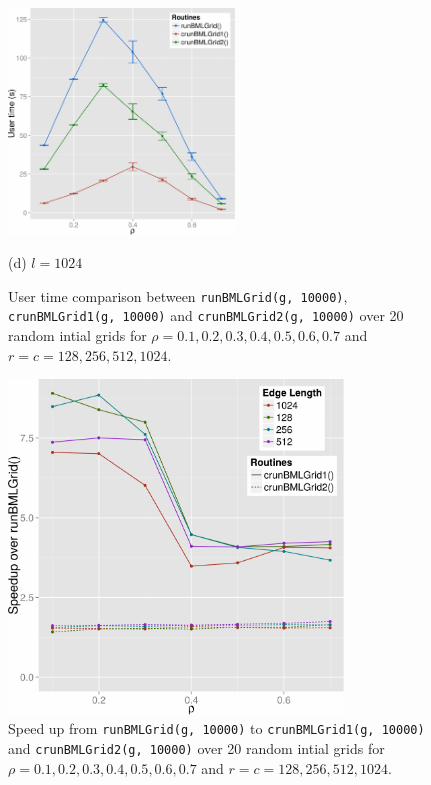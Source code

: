 \documentclass{article}
\begin{document}
\begin{figure}[H]
\begin{minipage}[b]{0.5\linewidth}
    \end{minipage}
    \hfill
    \begin{minipage}[b]{0.5\linewidth}
      \centering
      \centerline{\includegraphics[width=6.0cm]{./figs/TestRunningTime_1024.pdf}}
      \centerline{(d) $l=1024$}\medskip
    \end{minipage}
    \caption{User time comparison between \texttt{runBMLGrid(g, 10000)},
    \texttt{crunBMLGrid1(g, 10000)} and \texttt{crunBMLGrid2(g, 10000)} over 20
    random intial grids for $\rho = 0.1, 0.2, 0.3, 0.4, 0.5, 0.6, 0.7$ and $r =
    c = 128, 256, 512, 1024$.}
    \label{fig:running_time}
\end{figure}

\begin{figure}[H]
    \centering
    \includegraphics[width=3.5in]{figs/SpeedUp.pdf}
    \caption{Speed up from \texttt{runBMLGrid(g, 10000)} to
    \texttt{crunBMLGrid1(g, 10000)} and \texttt{crunBMLGrid2(g, 10000)} over 20
    random intial grids for $\rho = 0.1, 0.2, 0.3, 0.4, 0.5, 0.6, 0.7$ and $r =
    c = 128, 256, 512, 1024$.}
    \label{fig:speed_up}
\end{figure}
\end{document}
